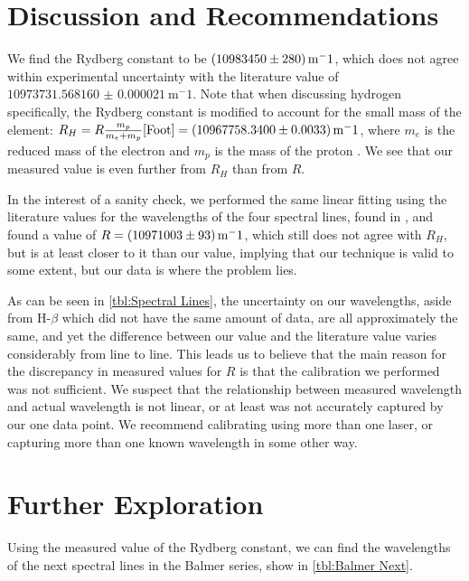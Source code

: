 \documentclass[11pt]{article}
\numberwithin{equation}{section}
\numberwithin{figure}{section}
\numberwithin{table}{section}
\begin{document}
\section{Discussion and Recommendations}\label{sec:DiscussionRecommendations}
\par We find the Rydberg constant to be $\SI{10983450\pm280}{\metre^-1}$, which does not agree within experimental uncertainty with the literature value of $\SI{10973731.568160(21)}{\metre^-1}$\cite{CODATA}. Note that when discussing hydrogen specifically, the Rydberg constant is modified to account for the small mass of the element: $R_H=R\frac{m_p}{m_e+m_p}\cite{Foot}=\SI{10967758.340\pm0.0033}{\metre^-1}$, where $m_e$ is the reduced mass of the electron and $m_p$ is the mass of the proton \cite{CODATA}. We see that our measured value is even further from $R_H$ than from $R$. 
\par In the interest of a sanity check, we performed the same linear fitting using the literature values for the wavelengths of the four spectral lines, found in \cite{Spectral Lines}, and found a value of $R=\SI{10971003\pm93}{\metre^-1}$, which still does not agree with $R_H$, but is at least closer to it than our value, implying that our technique is valid to some extent, but our data is where the problem lies.
\par As can be seen in \autoref{tbl:Spectral Lines}, the uncertainty on our wavelengths, aside from H-$\beta$ which did not have the same amount of data, are all approximately the same, and yet the difference between our value and the literature value varies considerably from line to line. This leads us to believe that the main reason for the discrepancy in measured values for $R$ is that the calibration we performed was not sufficient. We suspect that the relationship between measured wavelength and actual wavelength is not linear, or at least was not accurately captured by our one data point. We recommend calibrating using more than one laser, or capturing more than one known wavelength in some other way.

\section{Further Exploration}\label{sec:Further Exploration}
\par Using the measured value of the Rydberg constant, we can find the wavelengths of the next spectral lines in the Balmer series, show in \autoref{tbl:Balmer Next}.
\end{document}
